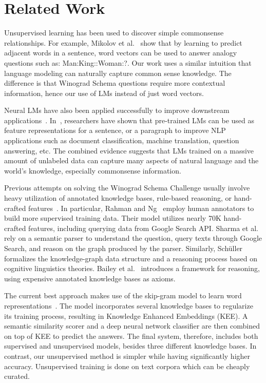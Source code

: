 \documentclass{article}
\begin{document}
\section{Related Work}
Unsupervised learning has been used to discover simple commonsense relationships. For example, Mikolov et al.~\cite{mikolov2013efficient,mikolov2013distributed} show that by learning to predict adjacent words in a sentence, word vectors can be used to answer analogy questions such as: Man:King::Woman:?. Our work uses a similar intuition that language modeling can naturally capture common sense knowledge. The difference is that Winograd Schema questions require more contextual information, hence our use of LMs instead of just word vectors. 

Neural LMs have also been applied successfully to improve downstream applications~\cite{dai2015semi,ramachandran2016unsupervised,peters2018deep,howard2018fine}. In~\cite{dai2015semi,ramachandran2016unsupervised,peters2018deep,howard2018fine}, researchers have shown that pre-trained LMs can be used as feature representations for a sentence, or a paragraph to improve NLP applications such as document classification, machine translation, question answering, etc. The combined evidence suggests that LMs trained on a massive amount of unlabeled data can capture many aspects of natural language and the world's knowledge, especially commonsense information. 

Previous attempts on solving the Winograd Schema Challenge usually involve heavy utilization of annotated knowledge bases, rule-based reasoning, or hand-crafted features~\cite{peng2015solving,bailey2015winograd,schuller2014tackling}. In particular, Rahman and Ng~\cite{rahman2012resolving} employ human annotators to build more supervised training data. Their model utilizes nearly 70K hand-crafted features, including querying data from Google Search API. Sharma et al.~\cite{sharma2015towards} rely on a semantic parser to understand the question, query texts through Google Search, and reason on the graph produced by the parser. Similarly, Sch{\"u}ller~\cite{schuller2014tackling} formalizes the knowledge-graph data structure and a reasoning process based on cognitive linguistics theories. Bailey et al.~\cite{bailey2015winograd} introduces a framework for reasoning, using expensive annotated knowledge bases as axioms.

The current best approach makes use of the skip-gram model to learn word representations~\cite{quanliu16winograd}. The model incorporates several knowledge bases to regularize its training process, resulting in Knowledge Enhanced Embeddings (KEE). A semantic similarity scorer and a deep neural network classifier are then combined on top of KEE to predict the answers. The final system, therefore, includes both supervised and unsupervised models, besides three different knowledge bases. In contrast, our unsupervised method is simpler while having significantly higher accuracy. Unsupervised training is done on text corpora which can be cheaply curated.
\end{document}
